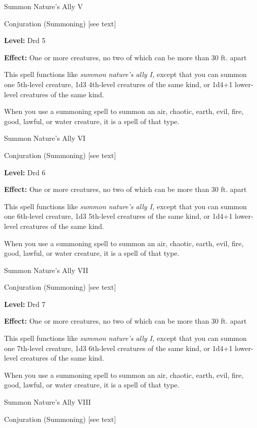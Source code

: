 \documentclass{article}
\begin{document}
\vspace{12pt}
Summon Nature's Ally V

Conjuration (Summoning) [see text]

\textbf{Level:} Drd 5

\textbf{Effect:} One or more creatures, no two of which can be more than 30 ft. 
apart

This spell functions like \textit{summon nature's ally I, }except that you can 
summon one 5th-level creature, 1d3 4th-level creatures of the same kind, or 1d4+1 
lower-level creatures of the same kind.

When you use a summoning spell to summon an air, chaotic, earth, evil, fire, good, 
lawful, or water creature, it is a spell of that type.

\vspace{12pt}
Summon Nature's Ally VI

Conjuration (Summoning) [see text]

\textbf{Level:} Drd 6

\textbf{Effect:} One or more creatures, no two of which can be more than 30 ft. 
apart

This spell functions like \textit{summon nature's ally I, }except that you can 
summon one 6th-level creature, 1d3 5th-level creatures of the same kind, or 1d4+1 
lower-level creatures of the same kind.

When you use a summoning spell to summon an air, chaotic, earth, evil, fire, good, 
lawful, or water creature, it is a spell of that type.

\vspace{12pt}
Summon Nature's Ally VII

Conjuration (Summoning) [see text]

\textbf{Level:} Drd 7

\textbf{Effect:} One or more creatures, no two of which can be more than 30 ft. 
apart

This spell functions like \textit{summon nature's ally I, }except that you can 
summon one 7th-level creature, 1d3 6th-level creatures of the same kind, or 1d4+1 
lower-level creatures of the same kind.

When you use a summoning spell to summon an air, chaotic, earth, evil, fire, good, 
lawful, or water creature, it is a spell of that type.

\vspace{12pt}
Summon Nature's Ally VIII

Conjuration (Summoning) [see text]
\end{document}
